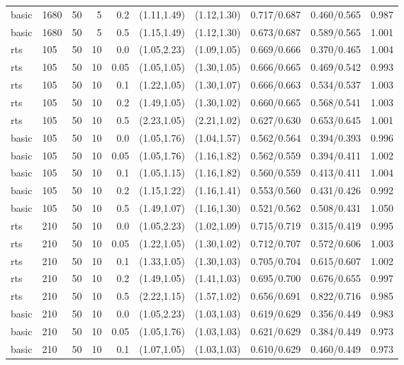 \begin{tabular}{llrrrccccc}
basic & 1680 & 50 & 5 & 0.2 & (1.11,1.49) & (1.12,1.30) & 0.717/0.687 & 0.460/0.565 & 0.987 \\
basic & 1680 & 50 & 5 & 0.5 & (1.15,1.49) & (1.12,1.30) & 0.673/0.687 & 0.589/0.565 & 1.001 \\
rts & 105 & 50 & 10 & 0.0 & (1.05,2.23) & (1.09,1.05) & 0.669/0.666 & 0.370/0.465 & 1.004 \\
rts & 105 & 50 & 10 & 0.05 & (1.05,1.05) & (1.30,1.05) & 0.666/0.665 & 0.469/0.542 & 0.993 \\
rts & 105 & 50 & 10 & 0.1 & (1.22,1.05) & (1.30,1.07) & 0.666/0.663 & 0.534/0.537 & 1.003 \\
rts & 105 & 50 & 10 & 0.2 & (1.49,1.05) & (1.30,1.02) & 0.660/0.665 & 0.568/0.541 & 1.003 \\
rts & 105 & 50 & 10 & 0.5 & (2.23,1.05) & (2.21,1.02) & 0.627/0.630 & 0.653/0.645 & 1.001 \\
basic & 105 & 50 & 10 & 0.0 & (1.05,1.76) & (1.04,1.57) & 0.562/0.564 & 0.394/0.393 & 0.996 \\
basic & 105 & 50 & 10 & 0.05 & (1.05,1.76) & (1.16,1.82) & 0.562/0.559 & 0.394/0.411 & 1.002 \\
basic & 105 & 50 & 10 & 0.1 & (1.05,1.15) & (1.16,1.82) & 0.560/0.559 & 0.413/0.411 & 1.004 \\
basic & 105 & 50 & 10 & 0.2 & (1.15,1.22) & (1.16,1.41) & 0.553/0.560 & 0.431/0.426 & 0.992 \\
basic & 105 & 50 & 10 & 0.5 & (1.49,1.07) & (1.16,1.30) & 0.521/0.562 & 0.508/0.431 & 1.050 \\
rts & 210 & 50 & 10 & 0.0 & (1.05,2.23) & (1.02,1.09) & 0.715/0.719 & 0.315/0.419 & 0.995 \\
rts & 210 & 50 & 10 & 0.05 & (1.22,1.05) & (1.30,1.02) & 0.712/0.707 & 0.572/0.606 & 1.003 \\
rts & 210 & 50 & 10 & 0.1 & (1.33,1.05) & (1.30,1.03) & 0.705/0.704 & 0.615/0.607 & 1.002 \\
rts & 210 & 50 & 10 & 0.2 & (1.49,1.05) & (1.41,1.03) & 0.695/0.700 & 0.676/0.655 & 0.997 \\
rts & 210 & 50 & 10 & 0.5 & (2.22,1.15) & (1.57,1.02) & 0.656/0.691 & 0.822/0.716 & 0.985 \\
basic & 210 & 50 & 10 & 0.0 & (1.05,2.23) & (1.03,1.03) & 0.619/0.629 & 0.356/0.449 & 0.983 \\
basic & 210 & 50 & 10 & 0.05 & (1.05,1.76) & (1.03,1.03) & 0.621/0.629 & 0.384/0.449 & 0.973 \\
basic & 210 & 50 & 10 & 0.1 & (1.07,1.05) & (1.03,1.03) & 0.610/0.629 & 0.460/0.449 & 0.973 \\

\end{tabular}
